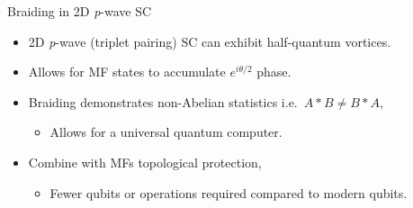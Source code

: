 \documentclass[xcolor=dvipsnames,10pt,aspectratio=169]{beamer}
\begin{document}



  \begin{frame}{Braiding in 2D \textit{p}-wave SC}
    \small
    \begin{itemize}
      \item 2D \textit{p}-wave (triplet pairing) SC can exhibit half-quantum vortices.
        \vspace{1em}
      \pause
      \item Allows for MF states to accumulate $e^{i\theta/2}$ phase.
        \vspace{1em}
      \pause
      \item Braiding demonstrates non-Abelian statistics i.e.\ $A*B \neq B*A$,
        \begin{itemize}
          \item[\rightarrow] Allows for a universal quantum computer.
        \end{itemize}
        \vspace{1em}
      \pause
      \item Combine with MFs topological protection,
        \begin{itemize}
          \item[\rightarrow] Fewer qubits or operations required compared to modern qubits.
        \end{itemize}
    \end{itemize}
  \end{frame}
\end{document}
